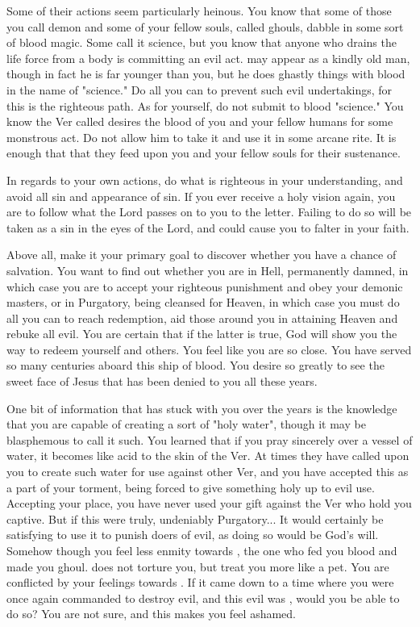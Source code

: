 \documentclass[char]{guildcamp4}
\begin{document}
Some of their actions seem particularly heinous. You know that some of those you call demon and some of your fellow souls, called ghouls, dabble in some sort of blood magic. Some call it science, but you know that anyone who drains the life force from a body is committing an evil act. \cJames{} may appear as a kindly old man, though in fact he is far younger than you, but he does ghastly things with blood in the name of "science." Do all you can to prevent such evil undertakings, for this is the righteous path. As for yourself, do not submit to blood "science." You know the Ver called \cVthree{} desires the blood of you and your fellow humans for some monstrous act. Do not allow him to take it and use it in some arcane rite. It is enough that that they feed upon you and your fellow souls for their sustenance.

In regards to your own actions, do what is righteous in your understanding, and avoid all sin and appearance of sin. If you ever receive a holy vision again, you are to follow what the Lord passes on to you to the letter. Failing to do so will be taken as a sin in the eyes of the Lord, and could cause you to falter in your faith.

Above all, make it your primary goal to discover whether you have a chance of salvation. You want to find out whether you are in Hell, permanently damned, in which case you are to accept your righteous punishment and obey your demonic masters, or in Purgatory, being cleansed for Heaven, in which case you must do all you can to reach redemption, aid those around you in attaining Heaven and rebuke all evil. You are certain that if the latter is true, God will show you the way to redeem yourself and others. You feel like you are so close. You have served so many centuries aboard this ship of blood. You desire so greatly to see the sweet face of Jesus that has been denied to you all these years.

One bit of information that has stuck with you over the years is the knowledge that you are capable of creating a sort of "holy water", though it may be blasphemous to call it such. You learned that if you pray sincerely over a vessel of water, it becomes like acid to the skin of the Ver. At times they have called upon you to create such water for use against other Ver, and you have accepted this as a part of your torment, being forced to give something holy up to evil use. Accepting your place, you have never used your gift against the Ver who hold you captive. But if this were truly, undeniably Purgatory... It would certainly be satisfying to use it to punish doers of evil, as doing so would be God's will. Somehow though you feel less enmity towards \cVone{}, the one who fed you \cVone{\their} blood and made you \cVone{\their} ghoul. \cVone{\They} does not torture you, but treat you more like a pet. You are conflicted by your feelings towards \cVone{\them}. If it came down to a time where you were once again commanded to destroy evil, and this evil was \cVone{\them}, would you be able to do so? You are not sure, and this makes you feel ashamed.
\end{document}
